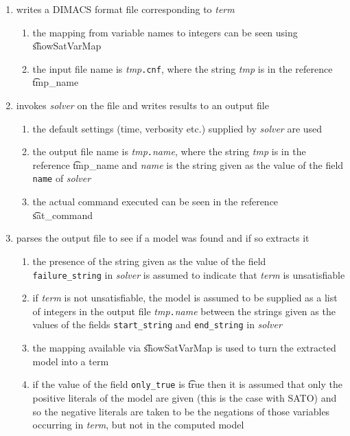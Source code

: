 \begin{enumerate}
\item writes a DIMACS format file corresponding to {\it term}
\begin{enumerate}
\item the mapping from \HOL variable names to integers can be seen using
\t{showSatVarMap}
\item the input file name is {\it tmp}{\tt{.cnf}}, where
the string {\it tmp} is in the reference \t{tmp\_name}
\end{enumerate}


\item invokes {\it solver} on the file and writes results to an output file


\begin{enumerate}
\item the default settings (time, verbosity etc.) supplied by {\it solver}
are used
\item the output file name is {\it tmp}{\tt{.}}{\it{name}}, where
the string {\it tmp} is in the reference \t{tmp\_name}
and {\it name} is the string given as the value of the field {\tt name} of {\it solver}
\item the actual command executed can be seen in the reference \\
\t{sat\_command}
\end{enumerate}


\item parses the output file to see if a model was found and if so extracts it

\begin{enumerate}
\item the presence of the string given as the value of the
field \\ {\tt failure\_string} in {\it solver} is
assumed to indicate that {\it term} is unsatisfiable
\item if {\it term} is not unsatisfiable,
the model is assumed to be supplied as a list of integers in the output file 
{\it tmp}{\tt{.}}{\it{name}} between the strings
given as the values of the fields {\tt start\_string} and {\tt end\_string}
in {\it solver}
\item the mapping available via \t{showSatVarMap} is used
to turn the extracted model into a \HOL term
\item if the value of the field {\tt only\_true} is
\t{true} then it is assumed that only the positive literals
of the model are given (this is the case with SATO) and so
the negative literals are taken to be the negations of those variables
occurring in {\it term}, but not in the computed model
\end{enumerate}



\end{enumerate}

